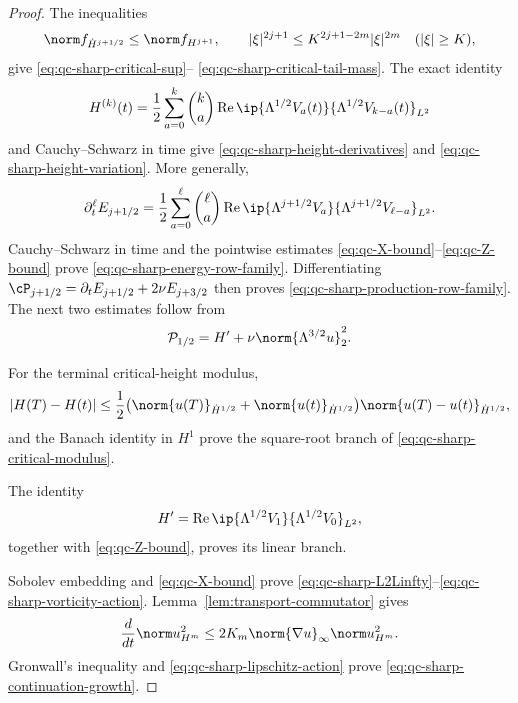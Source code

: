 {\begin{proof}
The inequalities
\[
 \norm f_{\dot H^{j+1/2}}\le\norm f_{H^{j+1}},
 \qquad
 |\xi|^{2j+1}\le K^{2j+1-2m}|\xi|^{2m}
 \quad(|\xi|\ge K),
\]
give \eqref{eq:qc-sharp-critical-sup}--
\eqref{eq:qc-sharp-critical-tail-mass}.  The exact identity
\[
 H^{(k)}(t)=\frac12\sum_{a=0}^{k}\binom ka
 \operatorname{Re}\ip{\Lambda^{1/2}V_a(t)}
 {\Lambda^{1/2}V_{k-a}(t)}_{L^2}
\]
and Cauchy--Schwarz in time give
\eqref{eq:qc-sharp-height-derivatives} and
\eqref{eq:qc-sharp-height-variation}.  More generally,
\[
 \partial_t^\ell E_{j+1/2}
 =\frac12\sum_{a=0}^{\ell}\binom\ell a
 \operatorname{Re}\ip{\Lambda^{j+1/2}V_a}
 {\Lambda^{j+1/2}V_{\ell-a}}_{L^2}.
\]
Cauchy--Schwarz in time and the pointwise estimates
\eqref{eq:qc-X-bound}--\eqref{eq:qc-Z-bound} prove
\eqref{eq:qc-sharp-energy-row-family}.  Differentiating
\(\cP_{j+1/2}=\partial_tE_{j+1/2}+2\nu E_{j+3/2}\)
then proves \eqref{eq:qc-sharp-production-row-family}.  The next two
estimates follow from
\[
 \mathcal P_{1/2}=H'+\nu\norm{\Lambda^{3/2}u}_2^2.
\]
\begin{samepage}
For the terminal critical-height modulus,
\[
 |H(T)-H(t)|
 \le\frac12\bigl(
 \norm{u(T)}_{\dot H^{1/2}}+\norm{u(t)}_{\dot H^{1/2}}
 \bigr)\norm{u(T)-u(t)}_{\dot H^{1/2}},
\]
and the Banach identity in \(H^1\) prove the square-root branch of
\eqref{eq:qc-sharp-critical-modulus}.
\par
\end{samepage}
The identity
\[
 H'=\operatorname{Re}
 \ip{\Lambda^{1/2}V_1}{\Lambda^{1/2}V_0}_{L^2},
\]
together with \eqref{eq:qc-Z-bound}, proves its linear branch.

Sobolev embedding and \eqref{eq:qc-X-bound} prove
\eqref{eq:qc-sharp-L2Linfty}--\eqref{eq:qc-sharp-vorticity-action}.
Lemma~\ref{lem:transport-commutator} gives
\[
 \frac d{dt}\norm u_{H^m}^2
 \le2K_m\norm{\nabla u}_\infty\norm u_{H^m}^2.
\]
Gronwall's inequality and \eqref{eq:qc-sharp-lipschitz-action} prove
\eqref{eq:qc-sharp-continuation-growth}.
\end{proof}
}

